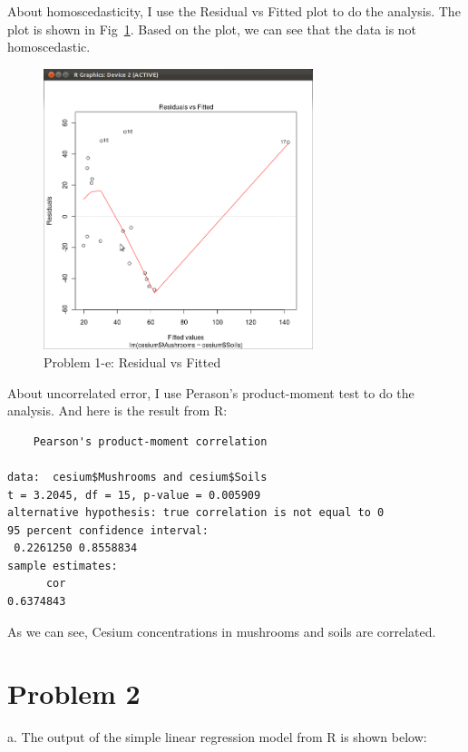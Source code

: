 \documentclass[12pt]{article}
\begin{document}
About homoscedasticity, I use the Residual vs Fitted plot to do the
analysis. The plot is shown in Fig~\ref{fig:p1-RvsF}. Based on the
plot, we can see that the data is not homoscedastic. \\

\begin{figure}[ht!]
  \centering
  \includegraphics[width=0.7\textwidth]{p1-RvsF}
  \caption{Problem 1-e: Residual vs Fitted \label{fig:p1-RvsF}}
\end{figure}

About uncorrelated error, I use Perason's product-moment test to do
the analysis. And here is the result from R:

\begin{verbatim}
	Pearson's product-moment correlation

data:  cesium$Mushrooms and cesium$Soils 
t = 3.2045, df = 15, p-value = 0.005909
alternative hypothesis: true correlation is not equal to 0 
95 percent confidence interval:
 0.2261250 0.8558834 
sample estimates:
      cor 
0.6374843 
\end{verbatim}

As we can see, Cesium concentrations in mushrooms and soils are
correlated.

\section*{Problem 2}

a. The output of the simple linear regression model from R is shown
below:
\end{document}
